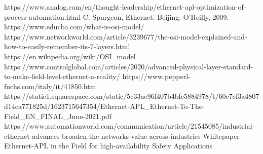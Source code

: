 \documentclass[conference]{IEEEtran}
\begin{document}
\begin{thebibliography}{00}
 https://www.analog.com/en/thought-leadership/ethernet-apl-optimization-of-process-automation.html
 C. Spurgeon, Ethernet. Beijing: O'Reilly, 2009.
 https://www.educba.com/what-is-osi-model/
 https://www.networkworld.com/article/3239677/the-osi-model-explained-and-how-to-easily-remember-its-7-layers.html
 https://en.wikipedia.org/wiki/OSI\_model
 https://www.controlglobal.com/articles/2020/advanced-physical-layer-standard-to-make-field-level-ethernet-a-reality/
 https://www.pepperl-fuchs.com/italy/it/41850.htm
 https://static1.squarespace.com/static/5c33ae96f407b4bfc5884978/t/60c7ef3a4807d14ca771825d/1623715647354/Ethernet-APL\_Ethernet-To-The-Field\_EN\_FINAL\_June-2021.pdf
 https://www.automationworld.com/communication/article/21545085/industrial-ethernet-advances-broaden-the-networks-value-across-industries
 Whitepaper Ethernet-APL in the Field for
high-availability Safety Applications
\end{thebibliography}
\end{document}
